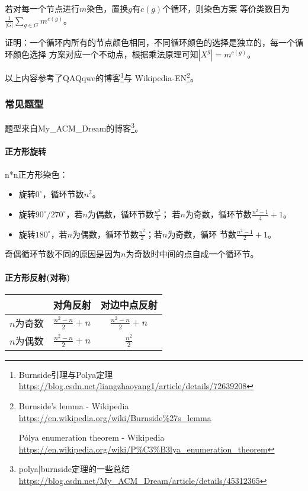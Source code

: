 \begin{theorem}
    若对每一个节点进行$m$染色，置换$g$有$c(g)$个循环，则染色方案
    等价类数目为$\displaystyle \frac{1}{|G|}\sum_{g\in G}m^{c(g)}$。
\end{theorem}

证明：一个循环内所有的节点颜色相同，不同循环颜色的选择是独立的，每一个循环颜色选择
方案对应一个不动点，根据乘法原理可知$|X^g|=m^{c(g)}$。

以上内容参考了QAQqwe的博客\footnote{Burnside引理与Polya定理
\url{https://blog.csdn.net/liangzhaoyang1/article/details/72639208}}与
Wikipedia-EN\footnote{
    Burnside's lemma - Wikipedia
    \url{https://en.wikipedia.org/wiki/Burnside\%27s\_lemma}

    Pólya enumeration theorem - Wikipedia
    \url{https://en.wikipedia.org/wiki/P\%C3\%B3lya\_enumeration\_theorem}
}。

\subsubsection{常见题型}
题型来自My\_ACM\_Dream的博客\footnote{polya|burnside定理的一些总结\\
\url{https://blog.csdn.net/My\_ACM\_Dream/article/details/45312365}}。

\paragraph{正方形旋转}
n*n正方形染色：
\begin{itemize}
    \item 旋转$0^\circ$，循环节数$n^2$。
	\item 旋转$90^\circ/270^\circ$，若$n$为偶数，循环节数$\frac{n^2}{4}$；
	若$n$为奇数，循环节数$\frac{n^2-1}{4}+1$。
    \item 旋转$180^\circ$，若$n$为偶数，循环节数$\frac{n^2}{2}$；若$n$为奇数，循环
    节数$\frac{n^2-1}{2}+1$。
\end{itemize}
奇偶循环节数不同的原因是因为$n$为奇数时中间的点自成一个循环节。
\paragraph{正方形反射(对称)}
\begin{tabular}{|c|c|c|}
	\hline
			 & 对角反射& 对边中点反射\\
	\hline
	$n$为奇数 & $\frac{n^2-n}{2}+n$& $\frac{n^2-n}{2}+n$ \\
	\hline
	$n$为偶数 & $\frac{n^2-n}{2}+n$& $\frac{n^2}{2}$\\
	\hline
\end{tabular}
